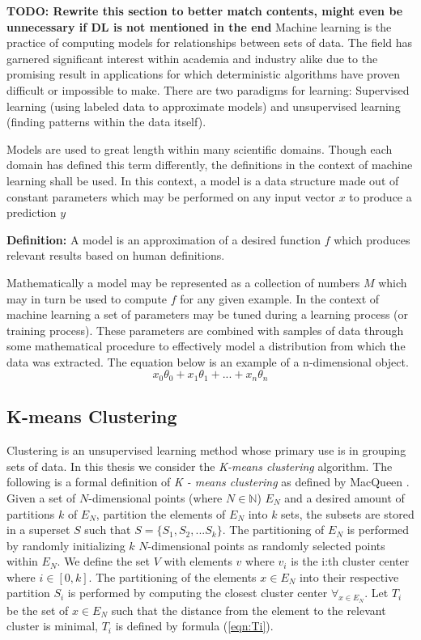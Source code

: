 \textbf{TODO: Rewrite this section to better match contents, might even be unnecessary if DL is not mentioned in the end}
Machine learning is the practice of computing models for relationships between sets of data. The field has garnered significant interest within academia and industry alike due to the promising result in applications for which deterministic algorithms have proven difficult or impossible to make. There are two paradigms for learning: Supervised learning (using labeled data to approximate models) and unsupervised learning (finding patterns within the data itself). 

Models are used to great length within many scientific domains. Though each domain has defined this term differently, the definitions in the context of machine learning shall be used. In this context, a model is a data structure made out of constant parameters which may be performed on any input vector $x$ to produce a prediction $y$

\vspace{5mm}

\textbf{Definition: } A model is an approximation of a desired function $f$ which produces relevant results based on human definitions.  

\vspace{5mm}

Mathematically a model may be represented as a collection of numbers $M$ which may in turn be used to compute $f$ for any given example.
In the context of machine learning a set of parameters may be tuned during a learning process (or training process). These parameters are combined with samples of data through some mathematical procedure to effectively model a distribution from which the data was extracted. The equation below is an example of a n-dimensional object.
$$x_0\theta_0 + x_1\theta_1 + ... + x_n\theta_n$$


\subsection{K-means Clustering}

Clustering is an unsupervised learning method whose primary use is in grouping sets of data. In this thesis we consider the \textit{K-means clustering} algorithm. The following is a formal definition of \textit{K - means clustering} as defined by MacQueen \cite{macqueen}. Given a set of $N$-dimensional points (where $N \in \mathbb{N}$) $E_N$ and a desired amount of partitions $k$ of $E_N$, partition the elements of $E_N$ into $k$ sets, the subsets are stored in a superset $S$ such that $S = \{S_1, S_2, ... S_k\}$. The partitioning of $E_N$ is performed by randomly initializing $k$  $N$-dimensional points as randomly selected points within $E_N$. We define the set $V$ with elements $v$ where $v_i$ is the i:th cluster center where $i \in [0, k]$. The partitioning of the elements $x \in E_N$ into their respective partition $S_i$ is performed by computing the closest cluster center $\forall_{x \in E_N}$. Let $T_i$ be the set of $x \in E_N$ such that the distance from the element to the relevant cluster is minimal, $T_i$ is defined by formula (\ref{eqn:Ti}).

